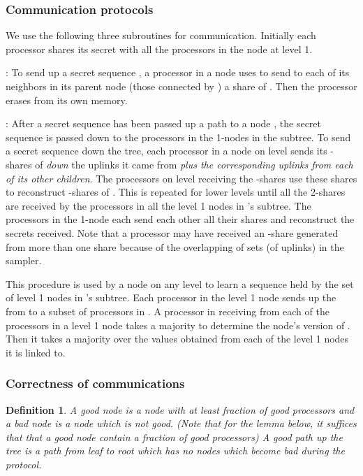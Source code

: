\documentclass[letterpaper,11pt]{article}
\newtheorem{definition}{Definition}
\begin{document}
\subsubsection{Communication protocols}


We use the following three subroutines for communication.  Initially each processor  shares its secret with all the processors in the  node at level 1.
 
\smallskip
\noindent
: To  send up a secret sequence , a  processor in a node uses   to  send to each of its neighbors in its parent node (those connected by ) a share of .  Then the processor erases  from its own memory.

\smallskip
\noindent
: After a secret sequence has been passed up a path to a node , the secret sequence is passed down to  the processors in the 1-nodes in the subtree.  To send a secret sequence  down the tree, each processor in a node  on level  sends its -shares of   {\it down} the uplinks it came from {\it plus the  corresponding uplinks from each of its other children}.  The processors  on level  receiving the -shares use these shares to reconstruct  -shares of . This is repeated for lower levels until  all the 2-shares are received by the processors in all the level 1 nodes in  's subtree. The processors in the 1-node  each send each other all their shares and reconstruct the secrets received. Note that a processor may have received an -share generated from more than one  share because of the overlapping of sets  (of uplinks) in the sampler.

\smallskip
\noindent
 This procedure is used by a node  on any level   to learn a sequence  held by the set of level 1 nodes in 's subtree.  Each processor in the level 1 node   sends  up the  from  to a subset of processors in . 
 A processor in  receiving  from each of the processors in a level 1 node takes a majority to determine the node's  version of  .
Then it takes a majority over  the values obtained from each of the level 1 nodes it is linked to.  

\subsubsection{Correctness of communications}\label{s:correct-comm}

\begin{definition} A {\it good node} is a node with at least  fraction of good processors and a bad node is a node which is not good.
(Note that for the lemma below, it suffices that that a good node contain a  fraction of good processors)
A {\it good path} up the tree is a path from leaf to root which has no nodes which become bad during the protocol. 
\end{definition}
\end{document}
